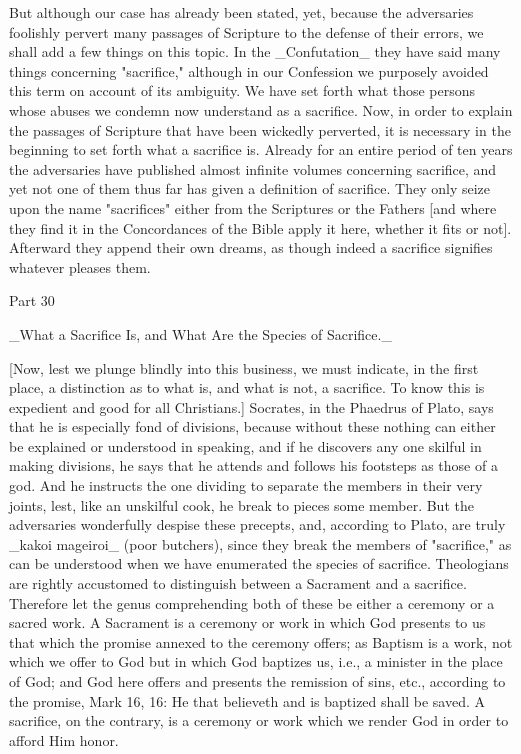 But although our case has already been stated, yet, because the
adversaries foolishly pervert many passages of Scripture to the
defense of their errors, we shall add a few things on this topic.  In
the _Confutation_ they have said many things concerning "sacrifice,"
although in our Confession we purposely avoided this term on account
of its ambiguity.  We have set forth what those persons whose abuses
we condemn now understand as a sacrifice.  Now, in order to explain
the passages of Scripture that have been wickedly perverted, it is
necessary in the beginning to set forth what a sacrifice is.  Already
for an entire period of ten years the adversaries have published
almost infinite volumes concerning sacrifice, and yet not one of them
thus far has given a definition of sacrifice.  They only seize upon
the name "sacrifices" either from the Scriptures or the Fathers [and
where they find it in the Concordances of the Bible apply it here,
whether it fits or not].  Afterward they append their own dreams, as
though indeed a sacrifice signifies whatever pleases them.




Part 30


_What a Sacrifice Is, and What Are the Species of Sacrifice._

[Now, lest we plunge blindly into this business, we must indicate, in
the first place, a distinction as to what is, and what is not, a
sacrifice.  To know this is expedient and good for all Christians.]
Socrates, in the Phaedrus of Plato, says that he is especially fond
of divisions, because without these nothing can either be explained
or understood in speaking, and if he discovers any one skilful in
making divisions, he says that he attends and follows his footsteps
as those of a god.  And he instructs the one dividing to separate the
members in their very joints, lest, like an unskilful cook, he break
to pieces some member.  But the adversaries wonderfully despise these
precepts, and, according to Plato, are truly _kakoi mageiroi_ (poor
butchers), since they break the members of "sacrifice," as can be
understood when we have enumerated the species of sacrifice.
Theologians are rightly accustomed to distinguish between a Sacrament
and a sacrifice.  Therefore let the genus comprehending both of these
be either a ceremony or a sacred work.  A Sacrament is a ceremony or
work in which God presents to us that which the promise annexed to
the ceremony offers; as Baptism is a work, not which we offer to God
but in which God baptizes us, i.e., a minister in the place of God;
and God here offers and presents the remission of sins, etc.,
according to the promise, Mark 16, 16: He that believeth and is
baptized shall be saved.  A sacrifice, on the contrary, is a ceremony
or work which we render God in order to afford Him honor.

